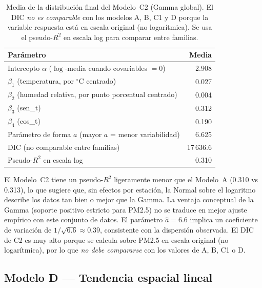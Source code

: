 \documentclass[12pt]{article}
\begin{document}
\begin{table}[H]
\centering
\caption{Media de la distribuci\'on final del Modelo~C2 (Gamma global).
         El DIC \emph{no es comparable} con los modelos A, B, C1 y D
         porque la variable respuesta est\'a en escala original
         (no logar\'itmica).
         Se usa el pseudo-$R^2$ en escala log para comparar entre familias.}
\label{tab:modC2}
\begin{tabular}{>{\raggedright\arraybackslash}p{8.5cm}r}
\toprule
Par\'ametro & Media \\
\midrule
Intercepto $\alpha$ ($\log$-media cuando covariables $= 0$)    & 2.908 \\
$\beta_1$ (temperatura, por $^\circ$C centrado)                & 0.027 \\
$\beta_2$ (humedad relativa, por punto porcentual centrado)    & 0.004 \\
$\beta_3$ (sen\_t)                                             & 0.312 \\
$\beta_4$ (cos\_t)                                             & 0.190 \\
Par\'ametro de forma $a$ (mayor $a$ = menor variabilidad)      & 6.625 \\
\midrule
DIC (no comparable entre familias)                             & 17\,636.6 \\
Pseudo-$R^2$ en escala log                                     & 0.310 \\
\bottomrule
\end{tabular}
\end{table}

El Modelo~C2 tiene un pseudo-$R^2$ ligeramente menor que el Modelo~A
(0.310 vs 0.313), lo que sugiere que, sin efectos por estaci\'on, la
Normal sobre el logaritmo describe los datos tan bien o mejor que la Gamma.
La ventaja conceptual de la Gamma (soporte positivo estricto para PM2.5)
no se traduce en mejor ajuste emp\'irico con este conjunto de datos.
El par\'ametro $\hat a = 6.6$ implica un coeficiente de variaci\'on de
$1/\sqrt{6.6} \approx 0.39$, consistente con la dispersi\'on observada.
El DIC de C2 es muy alto porque se calcula sobre PM2.5 en escala original
(no logarítmica), por lo que \emph{no debe compararse} con los valores
de A, B, C1 o D.


\subsection{Modelo D --- Tendencia espacial lineal}
\end{document}
